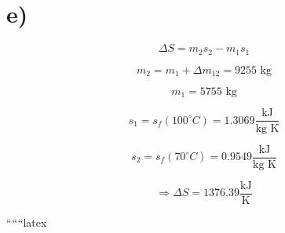 

\section*{e)}

\[
\Delta S = m_2 s_2 - m_1 s_1
\]

\[
m_2 = m_1 + \Delta m_{12} = 9255 \text{ kg}
\]

\[
m_1 = 5755 \text{ kg}
\]

\[
s_1 = s_f (100^\circ C) = 1.3069 \frac{\text{kJ}}{\text{kg K}}
\]

\[
s_2 = s_f (70^\circ C) = 0.9549 \frac{\text{kJ}}{\text{kg K}}
\]

\[
\Rightarrow \Delta S = 1376.39 \frac{\text{kJ}}{\text{K}}
\]

``````latex